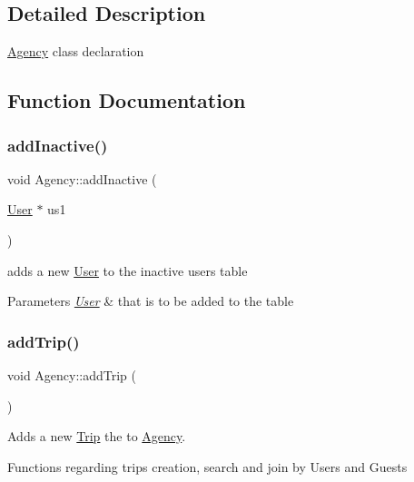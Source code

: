 \subsection{Detailed Description}
\hyperlink{class_agency}{Agency} class declaration 

\subsection{Function Documentation}
\mbox{\label{group___agency_gaca43b6ff4d5b43aae73779cf271ac0fe}} 
\subsubsection{\texorpdfstring{add\+Inactive()}{addInactive()}}
{\footnotesize\ttfamily void Agency\+::add\+Inactive (\begin{DoxyParamCaption}\item[{\hyperlink{class_user}{User} $\ast$}]{us1 }\end{DoxyParamCaption})}



adds a new \hyperlink{class_user}{User} to the inactive users table 


\begin{DoxyParams}{Parameters}
{\em \hyperlink{class_user}{User}} & that is to be added to the table \\
\hline
\end{DoxyParams}
\mbox{\label{group___agency_gaa0c7d82673ce6b573ccc46da3289634c}} 
\subsubsection{\texorpdfstring{add\+Trip()}{addTrip()}}
{\footnotesize\ttfamily void Agency\+::add\+Trip (\begin{DoxyParamCaption}{ }\end{DoxyParamCaption})}



Adds a new \hyperlink{class_trip}{Trip} the to \hyperlink{class_agency}{Agency}. 

Functions regarding trips creation, search and join by Users and Guests \mbox{\label{group___agency_ga9307d4ce4dd311f5744592248be6c9e5}} 
